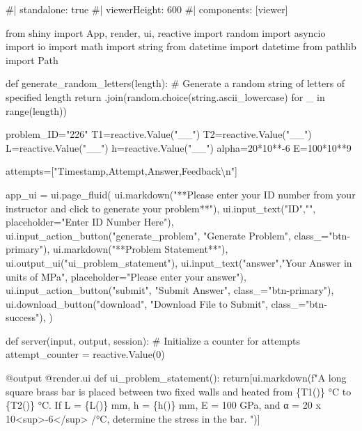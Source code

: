 \documentclass[
  letterpaper,
  DIV=11,
  numbers=noendperiod]{scrreprt}
\newenvironment{Shaded}{\begin{snugshade}}{\end{snugshade}}
\newcommand{\NormalTok}[1]{\textcolor[rgb]{0.00,0.23,0.31}{#1}}
\begin{document}
\begin{Shaded}
\begin{Highlighting}[]
\NormalTok{\#| standalone: true}
\NormalTok{\#| viewerHeight: 600}
\NormalTok{\#| components: [viewer]}

\NormalTok{from shiny import App, render, ui, reactive}
\NormalTok{import random}
\NormalTok{import asyncio}
\NormalTok{import io}
\NormalTok{import math}
\NormalTok{import string}
\NormalTok{from datetime import datetime}
\NormalTok{from pathlib import Path}

\NormalTok{def generate\_random\_letters(length):}
\NormalTok{    \# Generate a random string of letters of specified length}
\NormalTok{    return \textquotesingle{}\textquotesingle{}.join(random.choice(string.ascii\_lowercase) for \_ in range(length)) }

\NormalTok{problem\_ID="226"}
\NormalTok{T1=reactive.Value("\_\_")}
\NormalTok{T2=reactive.Value("\_\_")}
\NormalTok{L=reactive.Value("\_\_")}
\NormalTok{h=reactive.Value("\_\_")}
\NormalTok{alpha=20*10**{-}6}
\NormalTok{E=100*10**9}

\NormalTok{attempts=["Timestamp,Attempt,Answer,Feedback\textbackslash{}n"]}

\NormalTok{app\_ui = ui.page\_fluid(}
\NormalTok{    ui.markdown("**Please enter your ID number from your instructor and click to generate your problem**"),}
\NormalTok{    ui.input\_text("ID","", placeholder="Enter ID Number Here"),}
\NormalTok{    ui.input\_action\_button("generate\_problem", "Generate Problem", class\_="btn{-}primary"),}
\NormalTok{    ui.markdown("**Problem Statement**"),}
\NormalTok{    ui.output\_ui("ui\_problem\_statement"),}
\NormalTok{    ui.input\_text("answer","Your Answer in units of MPa", placeholder="Please enter your answer"),}
\NormalTok{    ui.input\_action\_button("submit", "Submit Answer", class\_="btn{-}primary"),}
\NormalTok{    ui.download\_button("download", "Download File to Submit", class\_="btn{-}success"),}
\NormalTok{)}


\NormalTok{def server(input, output, session):}
\NormalTok{    \# Initialize a counter for attempts}
\NormalTok{    attempt\_counter = reactive.Value(0)}

\NormalTok{    @output}
\NormalTok{    @render.ui}
\NormalTok{    def ui\_problem\_statement():}
\NormalTok{        return[ui.markdown(f"A long square brass bar is placed between two fixed walls and heated from \{T1()\} °C to \{T2()\} °C. If L = \{L()\} mm, h = \{h()\} mm, E = 100 GPa, and α = 20 x 10\textless{}sup\textgreater{}{-}6\textless{}/sup\textgreater{} /°C, determine the stress in the bar.  ")]}
    

\end{Highlighting}
\end{Shaded}
\end{document}

